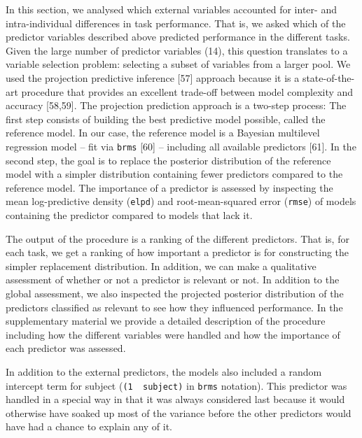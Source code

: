 \documentclass[
  man,floatsintext]{apa6}
\begin{document}
In this section, we analysed which external variables accounted for inter- and intra-individual differences in task performance. That is, we asked which of the predictor variables described above predicted performance in the different tasks. Given the large number of predictor variables (14), this question translates to a variable selection problem: selecting a subset of variables from a larger pool. We used the projection predictive inference {[}57{]} approach because it is a state-of-the-art procedure that provides an excellent trade-off between model complexity and accuracy {[}58,59{]}. The projection prediction approach is a two-step process: The first step consists of building the best predictive model possible, called the reference model. In our case, the reference model is a Bayesian multilevel regression model -- fit via \texttt{brms} {[}60{]} -- including all available predictors {[}61{]}. In the second step, the goal is to replace the posterior distribution of the reference model with a simpler distribution containing fewer predictors compared to the reference model. The importance of a predictor is assessed by inspecting the mean log-predictive density (\texttt{elpd}) and root-mean-squared error (\texttt{rmse}) of models containing the predictor compared to models that lack it.

The output of the procedure is a ranking of the different predictors. That is, for each task, we get a ranking of how important a predictor is for constructing the simpler replacement distribution. In addition, we can make a qualitative assessment of whether or not a predictor is relevant or not. In addition to the global assessment, we also inspected the projected posterior distribution of the predictors classified as relevant to see how they influenced performance. In the supplementary material we provide a detailed description of the procedure including how the different variables were handled and how the importance of each predictor was assessed.

In addition to the external predictors, the models also included a random intercept term for subject (\texttt{(1\ \textbar{}\ subject)} in \texttt{brms} notation). This predictor was handled in a special way in that it was always considered last because it would otherwise have soaked up most of the variance before the other predictors would have had a chance to explain any of it.
\end{document}
